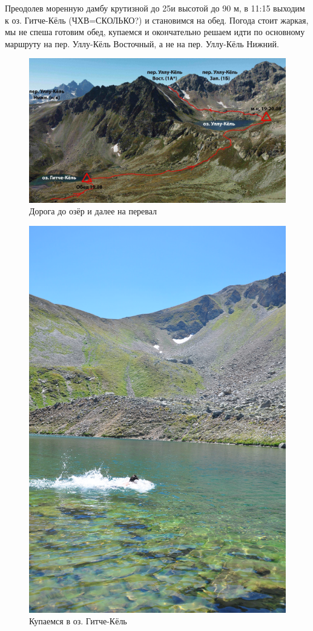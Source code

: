Преодолев моренную дамбу крутизной до 25\degree и высотой до 90 м, в 11:15 выходим к оз. Гитче-Кёль (ЧХВ=\alert{СКОЛЬКО?}) и становимся на обед. 
Погода стоит жаркая, мы не спеша готовим обед, купаемся и окончательно решаем идти по основному маршруту на пер. Уллу-Кёль Восточный, а не на пер. Уллу-Кёль Нижний.



\begin{figure}[h!]
	\centering
	\includegraphics[width=0.7\linewidth]{../pics/ullu_kuel_route}
	\caption{Дорога до озёр и далее на перевал}
	\label{fig:ullu_kuel_route}
\end{figure}

\begin{figure}[h!]
	\centering
	\begin{turn}{90}
		\includegraphics[width=0.7\linewidth]{../pics/DSC_0774}
	\end{turn}
	\caption{Купаемся в оз. Гитче-Кёль}
	\label{fig:DSC_0774}
\end{figure}

